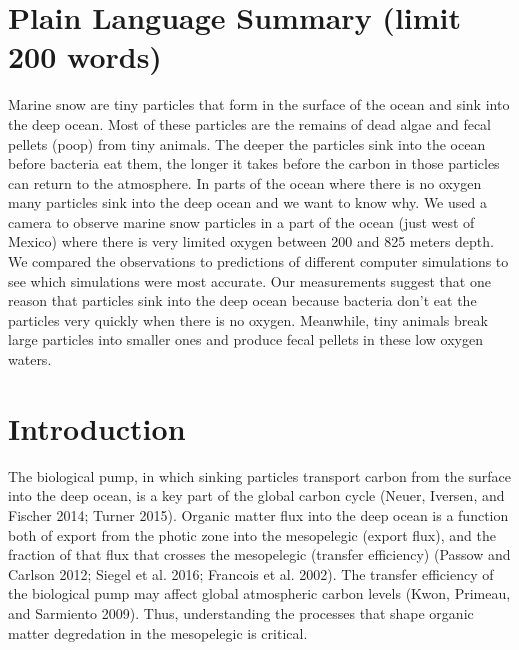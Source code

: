 \documentclass[]{article}
\begin{document}
\hypertarget{plain-language-summary-limit-200-words}{%
\section{Plain Language Summary (limit 200
words)}\label{plain-language-summary-limit-200-words}}

Marine snow are tiny particles that form in the surface of the ocean and
sink into the deep ocean. Most of these particles are the remains of
dead algae and fecal pellets (poop) from tiny animals. The deeper the
particles sink into the ocean before bacteria eat them, the longer it
takes before the carbon in those particles can return to the atmosphere.
In parts of the ocean where there is no oxygen many particles sink into
the deep ocean and we want to know why. We used a camera to observe
marine snow particles in a part of the ocean (just west of Mexico) where
there is very limited oxygen between 200 and 825 meters depth. We
compared the observations to predictions of different computer
simulations to see which simulations were most accurate. Our
measurements suggest that one reason that particles sink into the deep
ocean because bacteria don't eat the particles very quickly when there
is no oxygen. Meanwhile, tiny animals break large particles into smaller
ones and produce fecal pellets in these low oxygen waters.

\hypertarget{introduction}{%
\section{Introduction}\label{introduction}}

The biological pump, in which sinking particles transport carbon from
the surface into the deep ocean, is a key part of the global carbon
cycle (Neuer, Iversen, and Fischer 2014; Turner 2015). Organic matter
flux into the deep ocean is a function both of export from the photic
zone into the mesopelegic (export flux), and the fraction of that flux
that crosses the mesopelegic (transfer efficiency) (Passow and Carlson
2012; Siegel et al. 2016; Francois et al. 2002). The transfer efficiency
of the biological pump may affect global atmospheric carbon levels
(Kwon, Primeau, and Sarmiento 2009). Thus, understanding the processes
that shape organic matter degredation in the mesopelegic is critical.
\end{document}
